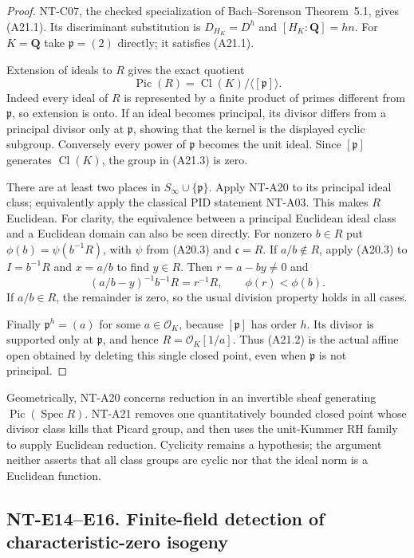 \begin{proof}
NT-C07, the checked specialization of Bach--Sorenson
Theorem~5.1, gives (A21.1). Its discriminant
substitution is $D_{H_K}=D^h$ and $[H_K:\mathbf Q]=hn$.
For $K=\mathbf Q$ take $\mathfrak p=(2)$ directly;
it satisfies (A21.1).

Extension of ideals to $R$ gives the exact quotient
\[
 \operatorname{Pic}(R)=
       \operatorname{Cl}(K)/\langle[\mathfrak p]\rangle.
 \tag{A21.3}
\]
Indeed every ideal of $R$ is represented by a finite
product of primes different from $\mathfrak p$,
so extension is onto. If an ideal becomes principal,
its divisor differs from a principal divisor only at
$\mathfrak p$, showing that the kernel is the displayed
cyclic subgroup. Conversely every power of
$\mathfrak p$ becomes the unit ideal.
Since $[\mathfrak p]$ generates $\operatorname{Cl}(K)$,
the group in (A21.3) is zero.

There are at least two places in
$S_\infty\cup\{\mathfrak p\}$. Apply NT-A20 to its
principal ideal class; equivalently apply the
classical PID statement NT-A03. This makes $R$
Euclidean. For clarity, the equivalence between a
principal Euclidean ideal class and a Euclidean domain
can also be seen directly. For nonzero $b\in R$ put
$\phi(b)=\psi(b^{-1}R)$, with $\psi$ from (A20.3) and
$\mathfrak c=R$. If $a/b\notin R$, apply (A20.3) to
$I=b^{-1}R$ and $x=a/b$ to find $y\in R$. Then
$r=a-by\ne0$ and
\[
       (a/b-y)^{-1}b^{-1}R=r^{-1}R,\qquad
                                  \phi(r)<\phi(b).
 \tag{A21.4}
\]
If $a/b\in R$, the remainder is zero, so the usual
division property holds in all cases.

Finally $\mathfrak p^h=(a)$ for some $a\in\mathcal O_K$,
because $[\mathfrak p]$ has order $h$. Its divisor
is supported only at $\mathfrak p$, and hence
$R=\mathcal O_K[1/a]$. Thus (A21.2) is the actual
affine open obtained by deleting this single closed
point, even when $\mathfrak p$ is not principal.
\end{proof}

Geometrically, NT-A20 concerns reduction in an
invertible sheaf generating
$\operatorname{Pic}(\operatorname{Spec}R)$.
NT-A21 removes one quantitatively bounded closed point
whose divisor class kills that Picard group, and then
uses the unit-Kummer RH family to supply Euclidean
reduction. Cyclicity remains a hypothesis; the
argument neither asserts that all class groups are
cyclic nor that the ideal norm is a Euclidean function.


\subsection*{NT-E14--E16. Finite-field detection of characteristic-zero isogeny}

